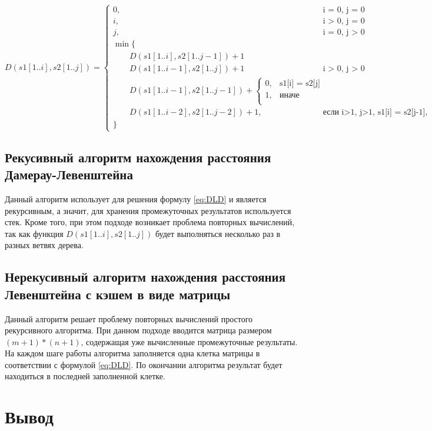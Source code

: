 \documentclass{report}
\begin{document}
\begin{equation}
\label{eq:DLD}
D(s1[1..i], s2[1..j]) = 
\begin{cases}
0,  &\text{i = 0, j = 0}\\
i,  &\text{i > 0, j = 0}\\
j,  &\text{i = 0, j >  0}\\
\min \lbrace \\
\qquad D(s1[1..i], s2[1..j-1]) + 1\\
\qquad D(s1[1..i-1], s2[1..j]) + 1 &\text{i > 0, j > 0}\\
\qquad D(s1[1..i-1], s2[1..j-1]) + 
\begin{cases} 
0, &\text{s1[i] = s2[j]}\\
1, &\text{иначе}\\ 
\end{cases}\\
\qquad D(s1[1..i-2], s2[1..j-2]) + 1, &\text{если i>1, j>1, s1[i] = s2[j-1], s1[i-1] = s2[j]} \\
\rbrace
\end{cases}
\end{equation}

\subsection{Рекусивный алгоритм нахождения расстояния Дамерау-Левенштейна}

Данный алгоритм использует для решения формулу \ref{eq:DLD} и является рекурсивным, а значит, для хранения промежуточных результатов используется стек. Кроме того, при этом подходе возникает проблема повторных вычислений, так как функция $D(s1[1..i], s2[1..j])$ будет выполняться несколько раз в разных ветвях дерева.

\subsection{Нерекусивный алгоритм нахождения расстояния Левенштейна с кэшем в виде матрицы}

Данный алгоритм решает проблему повторных вычислений простого рекурсивного алгоритма. При данном подходе вводится матрица размером $(m + 1) * (n + 1)$, содержащая уже вычисленные промежуточные результаты. На каждом шаге работы алгоритма заполняется одна клетка матрицы в соответствии с формулой \ref{eq:DLD}. По окончании алгоритма результат будет находиться в последней заполненной клетке.


\section{Вывод}
\end{document}
